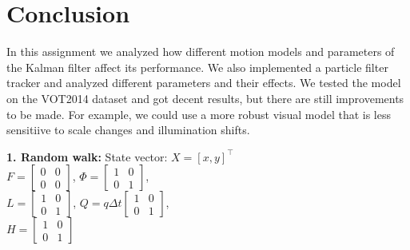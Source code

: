 \documentclass[9pt]{IEEEtran}
\begin{document}
 
\section{Conclusion}
In this assignment we analyzed how different motion models and parameters of the Kalman filter affect its performance.
We also implemented a particle filter tracker and analyzed different parameters and their effects. We tested the model
on the VOT2014 dataset and got decent results, but there are still improvements to be made. For example, we could
use a more robust visual model that is less sensitiive to scale changes and illumination shifts.





\appendix
\textbf{1. Random walk:}
State vector: $X = [x, y]^\top$ \\
$F = \begin{bmatrix} 0 & 0 \\ 0 & 0 \end{bmatrix}$, 
$\Phi = \begin{bmatrix} 1 & 0 \\ 0 & 1 \end{bmatrix}$, \\
$L = \begin{bmatrix} 1 & 0 \\ 0 & 1 \end{bmatrix}$, 
$Q = q \Delta t \begin{bmatrix} 1 & 0 \\ 0 & 1 \end{bmatrix}$, \\
$H = \begin{bmatrix} 1 & 0 \\ 0 & 1 \end{bmatrix}$ \\
\end{document}
